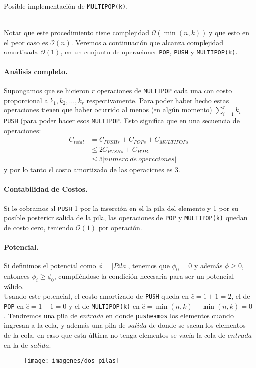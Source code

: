 \documentclass[dcc,uchile]{fcfmcourse}
\theoremstyle{plain}
\theoremstyle{definition}
\begin{document}
\begin{problems}
\problem Posible implementación de \texttt{MULTIPOP(k)}.
\begin{algorithm}
\end{algorithm}
\\Notar que este procedimiento tiene complejidad $\mathcal{O}(\min(n,k))$ y que esto en el peor caso es  $\mathcal{O}(n)$. Veremos a continuación que alcanza complejidad amortizada $\mathcal{O}(1)$, en un conjunto de operaciones \texttt{POP}, \texttt{PUSH} y \texttt{MULTIPOP(k)}.
\paragraph{Análisis completo.} Supongamos que se hicieron $r$ operaciones de \texttt{MULTIPOP} cada una con costo proporcional a $k_{1}, k_{2}, \ldots, k_{r}$ respectivamente. Para poder haber hecho estas operaciones tienen que haber ocurrido al menos (en algún momento) $\sum_{i=1}^r k_{i}$ \texttt{PUSH} (para poder hacer esos \texttt{MULTIPOP}. Esto significa que en una secuencia de operaciones:
\begin{align*}
    C_{total} &= C_{PUSHs} + C_{POPs} + C_{MULTIPOPs} \\
    &\le 2C_{PUSHs} + C_{POPs}\\
    &\le 3|numero\ de\ operaciones|
\end{align*}
y por lo tanto el costo amortizado de las operaciones es $3$.

\paragraph{Contabilidad de Costos.} Si le cobramos al \texttt{PUSH} 1 por la inserción en el la pila del elemento y 1 por su posible posterior salida de la pila, las operaciones de \texttt{POP} y \texttt{MULTIPOP(k)} quedan de costo cero, teniendo $\mathcal{O}(1)$ por operación.

\paragraph{Potencial.}
Si definimos el potencial como $\phi = |Pila|$, tenemos que $\phi_0 = 0$ y además $\phi \ge 0$, entonces $\phi_i\ge \phi_0$, cumpliéndose la condición necesaria para ser un potencial válido.\\
Usando este potencial, el costo amortizado de \texttt{PUSH} queda en $\hat{c} = 1 + 1 = 2$, el de \texttt{POP} en $\hat{c} = 1 - 1 = 0$ y el de \texttt{MULTIPOP(k)} en $\hat{c} = \min(n,k) - \min(n,k) = 0$.
\problem Tendremos una pila de $entrada$ en donde \texttt{pusheamos} los elementos cuando ingresan a la cola, y además una pila de $salida$ de donde se sacan los elementos de la cola, en caso que esta última no tenga elementos se vacía la cola de $entrada$ en la de $salida$.
\begin{figure}[h]
    \centering
    \texttt{[image: imagenes/dos\_pilas]}
\end{figure}


\end{problems}
\end{document}
